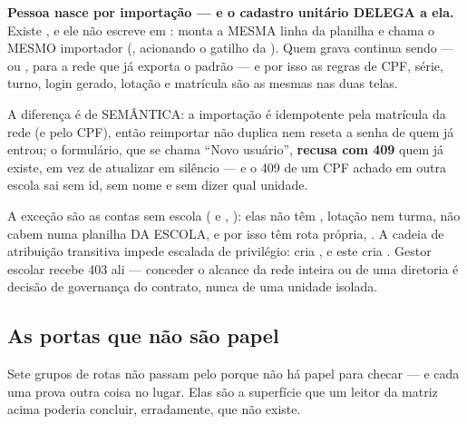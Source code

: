 \begin{decisao}
\textbf{Pessoa nasce por importação --- e o cadastro unitário DELEGA a ela.}
Existe , e ele não escreve em : monta a MESMA
linha da planilha e chama o MESMO importador (, acionando o
gatilho da ). Quem grava continua sendo
 --- ou , para a
rede que já exporta o padrão --- e por isso as regras de CPF, série, turno,
login gerado, lotação e matrícula são as mesmas nas duas telas.

A diferença é de SEMÂNTICA: a importação é idempotente pela matrícula da rede (e
pelo CPF), então reimportar não duplica nem reseta a senha de quem já entrou; o
formulário, que se chama \enquote{Novo usuário}, \textbf{recusa com 409} quem já
existe, em vez de atualizar em silêncio --- e o 409 de um CPF achado em outra
escola sai sem id, sem nome e sem dizer qual unidade.

A exceção são as contas sem escola ( e
, ): elas não têm , lotação nem
turma, não cabem numa planilha DA ESCOLA, e por isso têm rota própria,
. A cadeia de atribuição transitiva impede
escalada de privilégio:  cria , e este cria
. Gestor escolar recebe 403 ali --- conceder o alcance da
rede inteira ou de uma diretoria é decisão de governança do contrato, nunca de
uma unidade isolada.
\end{decisao}

\subsection{As portas que não são papel}

Sete grupos de rotas não passam pelo  porque não há papel
para checar ---
e cada uma prova outra coisa no lugar. Elas são a superfície que um leitor da
matriz acima poderia concluir, erradamente, que não existe.

